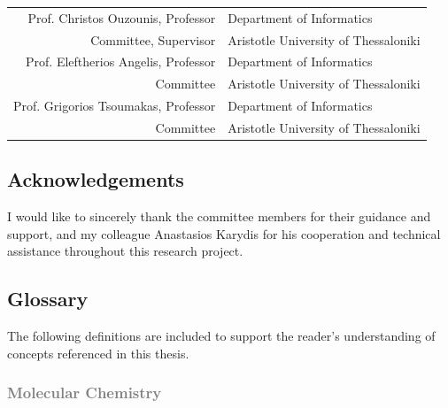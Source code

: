 \documentclass[a4paper,12pt]{extarticle}
\begin{document}
  \vspace{3mm}

  {
    \setlength{\tabcolsep}{3.2mm}
    \begin{tabular}{r l}
      Prof. Christos Ouzounis, Professor & Department of Informatics
      \\[2mm]
      Committee, Supervisor & Aristotle University of Thessaloniki
      \\[4mm]
      Prof. Eleftherios Angelis, Professor & Department of Informatics
      \\[2mm]
      Committee & Aristotle University of Thessaloniki
      \\[4mm]
      Prof. Grigorios Tsoumakas, Professor & Department of Informatics
      \\[2mm]
      Committee & Aristotle University of Thessaloniki
    \end{tabular}
  }

  \vspace{3cm}

  \subsection*{%
    Acknowledgements
  }

  I would like to sincerely thank the committee members for their guidance and support, and my colleague Anastasios Karydis for his cooperation and technical assistance throughout this research project.

  \vspace{\fill}

  \cleardoublepage


  \tableofcontents
  \cleardoublepage


  \subsection*{%
    \centering Glossary
  }
  
  The following definitions are included to support the reader's understanding of concepts referenced in this thesis.
  
  \subsubsection*{%
    \textcolor{gray}{Molecular Chemistry}
  }
\end{document}
